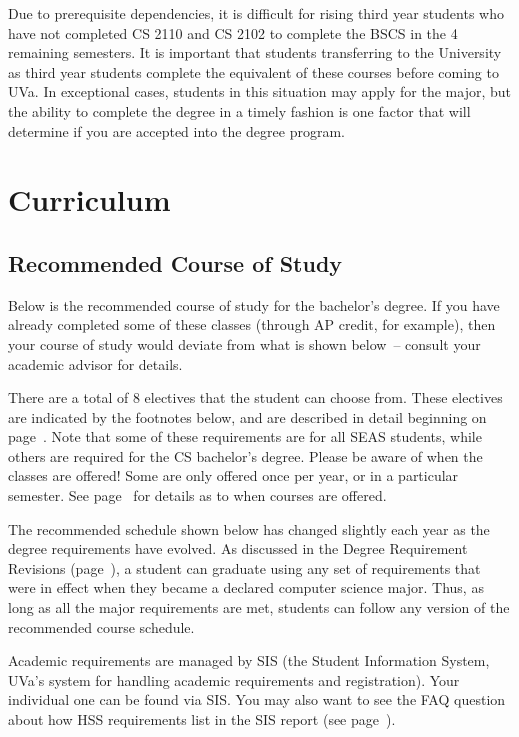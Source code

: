 \documentclass[10pt,letter]{book}
\newcommand{\mysection}[1]{\section{#1}\renewcommand{\rightmark}{#1}}
\newcommand{\myurl}[1]{\footnote{\scriptsize\url{#1}}}
\begin{document}
Due to prerequisite dependencies, it is difficult for rising third year
students who have not completed CS 2110 and CS 2102 to complete the
BSCS in the 4 remaining semesters. It is important that students
transferring to the University as third year students complete the equivalent
of these courses before coming to UVa. In exceptional cases, students
in this situation may apply for the major, but the ability to complete
the degree in a timely fashion is one factor that will determine if
you are accepted into the degree program.


\mysection{Curriculum}

\subsection{Recommended Course of Study}

Below is the recommended course of study for the bachelor's degree. If
you have already completed some of these classes (through AP credit,
for example), then your course of study would deviate from what is
shown below~-- consult your academic advisor for details.

There are a total of 8 electives that the student can choose
from. These electives are indicated by the footnotes below, and are
described in detail beginning on page~\pageref{sec:electiveinfo}. Note
that some of these requirements are for all SEAS students, while
others are required for the CS bachelor's degree. Please be aware of
when the classes are offered! Some are only offered once per year, or
in a particular semester. See page~\pageref{sec:coursedesc} for details
as to when courses are offered.

The recommended schedule shown below has changed slightly each year as
the degree requirements have evolved. As discussed in the Degree
Requirement Revisions (page~\pageref{sec:degreerevisions}), a student
can graduate using any set of requirements that were in effect when
they became a declared computer science major. Thus, as long as all
the major requirements are met, students can follow any version of the
recommended course schedule.

Academic requirements are managed by SIS (the Student Information
System, UVa's system for handling academic requirements and
registration).
Your individual one can be found via SIS.  You may also want to see
the FAQ question about how HSS requirements list in the SIS report
(see page~\pageref{sec:sishssissue}).
\end{document}
